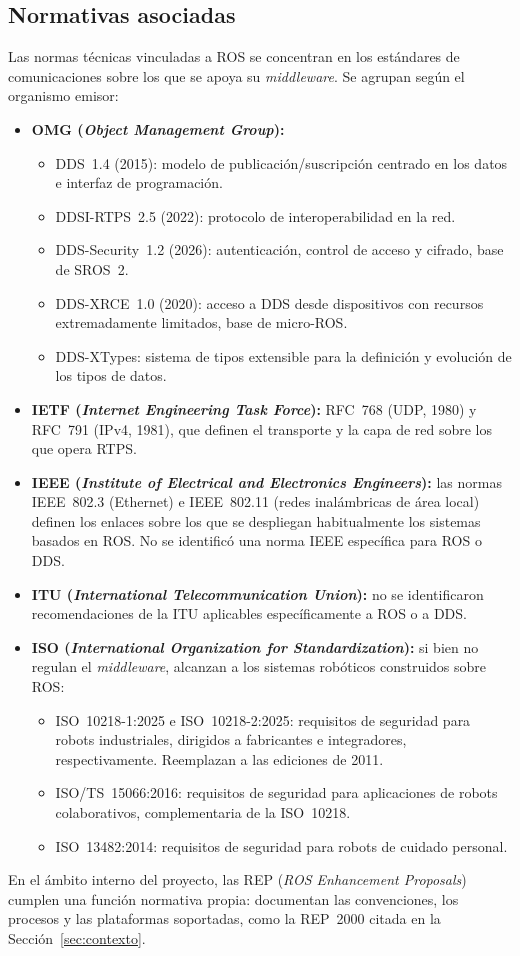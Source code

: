 \subsection{Normativas asociadas}\label{sec:normativas}

Las normas técnicas vinculadas a ROS se concentran en los estándares de
comunicaciones sobre los que se apoya su \textit{middleware}. Se agrupan según
el organismo emisor:
\begin{itemize}
    \item \textbf{OMG (\textit{Object Management Group}):}
    \begin{itemize}
        \item DDS~1.4 (2015): modelo de publicación/suscripción centrado en los
        datos e interfaz de programación.
        \item DDSI-RTPS~2.5 (2022): protocolo de interoperabilidad en la red.
        \item DDS-Security~1.2 (2026): autenticación, control de acceso y
        cifrado, base de SROS~2.
        \item DDS-XRCE~1.0 (2020): acceso a DDS desde dispositivos con recursos
        extremadamente limitados, base de micro-ROS.
        \item DDS-XTypes: sistema de tipos extensible para la definición y
        evolución de los tipos de datos.
    \end{itemize}
    \item \textbf{IETF (\textit{Internet Engineering Task Force}):} RFC~768
    (UDP, 1980) y RFC~791 (IPv4, 1981), que definen el transporte y la capa de
    red sobre los que opera RTPS.
    \item \textbf{IEEE (\textit{Institute of Electrical and Electronics
    Engineers}):} las normas IEEE~802.3 (Ethernet) e IEEE~802.11 (redes
    inalámbricas de área local) definen los enlaces sobre los que se
    despliegan habitualmente los sistemas basados en ROS. No se identificó una
    norma IEEE específica para ROS o DDS.
    \item \textbf{ITU (\textit{International Telecommunication Union}):} no se
    identificaron recomendaciones de la ITU aplicables específicamente a ROS o
    a DDS.
    \item \textbf{ISO (\textit{International Organization for
    Standardization}):} si bien no regulan el \textit{middleware}, alcanzan a
    los sistemas robóticos construidos sobre ROS:
    \begin{itemize}
        \item ISO~10218-1:2025 e ISO~10218-2:2025: requisitos de seguridad
        para robots industriales, dirigidos a fabricantes e integradores,
        respectivamente. Reemplazan a las ediciones de 2011.
        \item ISO/TS~15066:2016: requisitos de seguridad para aplicaciones de
        robots colaborativos, complementaria de la ISO~10218.
        \item ISO~13482:2014: requisitos de seguridad para robots de cuidado
        personal.
    \end{itemize}
\end{itemize}

En el ámbito interno del proyecto, las REP (\textit{ROS Enhancement
Proposals}) cumplen una función normativa propia: documentan las convenciones,
los procesos y las plataformas soportadas, como la REP~2000 citada en la
Sección~\ref{sec:contexto}.
